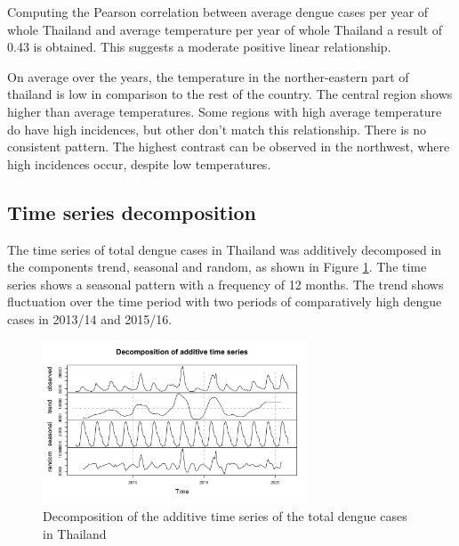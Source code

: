 Computing the Pearson correlation between average dengue cases per year of whole Thailand and average temperature per year of whole Thailand a result of 0.43 is obtained. This suggests a moderate positive linear relationship. 

On average over the years, the temperature in the norther-eastern part of thailand is low in comparison to the rest of the country. The central region shows higher than average temperatures. 
Some regions with high average temperature do have high incidences, but other don’t match this relationship. There is no consistent pattern. The highest contrast can be observed in the northwest, where high incidences occur, despite low temperatures.



	\subsection{Time series decomposition}The time series of total dengue cases in Thailand was additively decomposed in the components trend, seasonal and random, as shown in Figure \ref{fig:decomp_ts_dengue}. The time series shows a seasonal pattern with a frequency of 12 months. The trend shows fluctuation over the time period with two periods of comparatively high dengue cases in 2013/14 and 2015/16.
	
	\begin{figure}[htbp] 
		\centering
		\includegraphics[width=0.7\textwidth]{fig/Decomposition_of_add_ts.png}
		\caption{ Decomposition of the additive time series of the total dengue cases in Thailand}
		\label{fig:decomp_ts_dengue}
	\end{figure}
	
